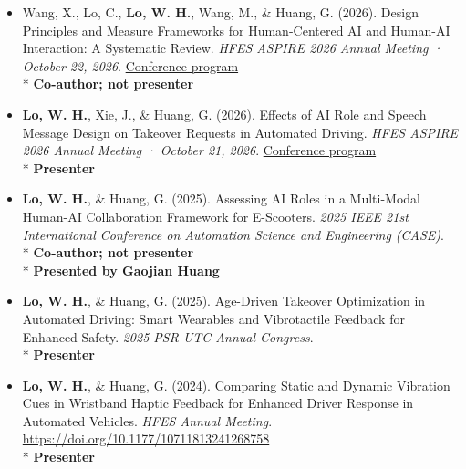 \documentclass[11pt]{article}
\begin{document}
\begin{itemize}[leftmargin=*, topsep=0pt, itemsep=6pt]

  \item \begin{samepage}Wang, X., Lo, C., \textbf{Lo, W. H.}, Wang, M., \& Huang, G. (2026). Design Principles and Measure Frameworks for Human-Centered AI and Human-AI Interaction: A Systematic Review. \textit{HFES ASPIRE 2026 Annual Meeting · October 22, 2026}. \href{https://hfesam2026.conference-program.com/presentation/?id=LECT425\&sess=sess213}{Conference program}\\* \textbf{Co-author; not presenter}
  \par\end{samepage}

  \item \begin{samepage}\textbf{Lo, W. H.}, Xie, J., \& Huang, G. (2026). Effects of AI Role and Speech Message Design on Takeover Requests in Automated Driving. \textit{HFES ASPIRE 2026 Annual Meeting · October 21, 2026}. \href{https://hfesam2026.conference-program.com/presentation/?id=LECT163\&sess=sess243}{Conference program}\\* \textbf{Presenter}
  \par\end{samepage}

  \item \begin{samepage}\textbf{Lo, W. H.}, \& Huang, G. (2025). Assessing AI Roles in a Multi-Modal Human-AI Collaboration Framework for E-Scooters. \textit{2025 IEEE 21st International Conference on Automation Science and Engineering (CASE)}.\\* \textbf{Co-author; not presenter}\\* \textbf{Presented by Gaojian Huang}
  \par\end{samepage}

  \item \begin{samepage}\textbf{Lo, W. H.}, \& Huang, G. (2025). Age-Driven Takeover Optimization in Automated Driving: Smart Wearables and Vibrotactile Feedback for Enhanced Safety. \textit{2025 PSR UTC Annual Congress}.\\* \textbf{Presenter}
  \par\end{samepage}

  \item \begin{samepage}\textbf{Lo, W. H.}, \& Huang, G. (2024). Comparing Static and Dynamic Vibration Cues in Wristband Haptic Feedback for Enhanced Driver Response in Automated Vehicles. \textit{HFES Annual Meeting}. \href{https://doi.org/10.1177/10711813241268758}{\url{https://doi.org/10.1177/10711813241268758}}\\* \textbf{Presenter}
  \par\end{samepage}


\end{itemize}
\end{document}
